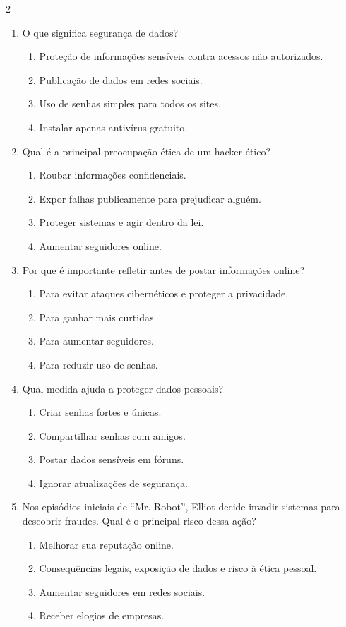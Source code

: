 \documentclass[11pt]{article}
\begin{document}
\begin{multicols}{2}
\begin{enumerate}[leftmargin=*]
\item O que significa segurança de dados?
\begin{enumerate}[label=\alph*)]
\item Proteção de informações sensíveis contra acessos não autorizados.
\item Publicação de dados em redes sociais.
\item Uso de senhas simples para todos os sites.
\item Instalar apenas antivírus gratuito.
\end{enumerate}

\item Qual é a principal preocupação ética de um hacker ético?
\begin{enumerate}[label=\alph*)]
\item Roubar informações confidenciais.
\item Expor falhas publicamente para prejudicar alguém.
\item Proteger sistemas e agir dentro da lei.
\item Aumentar seguidores online.
\end{enumerate}

\item Por que é importante refletir antes de postar informações online?
\begin{enumerate}[label=\alph*)]
\item Para evitar ataques cibernéticos e proteger a privacidade.
\item Para ganhar mais curtidas.
\item Para aumentar seguidores.
\item Para reduzir uso de senhas.
\end{enumerate}

\item Qual medida ajuda a proteger dados pessoais?
\begin{enumerate}[label=\alph*)]
\item Criar senhas fortes e únicas.
\item Compartilhar senhas com amigos.
\item Postar dados sensíveis em fóruns.
\item Ignorar atualizações de segurança.
\end{enumerate}

\item Nos episódios iniciais de ``Mr. Robot'', Elliot decide invadir sistemas para descobrir fraudes. Qual é o principal risco dessa ação?
\begin{enumerate}[label=\alph*)]
\item Melhorar sua reputação online.
\item Consequências legais, exposição de dados e risco à ética pessoal.
\item Aumentar seguidores em redes sociais.
\item Receber elogios de empresas.
\end{enumerate}


\end{enumerate}
\end{multicols}
\end{document}
